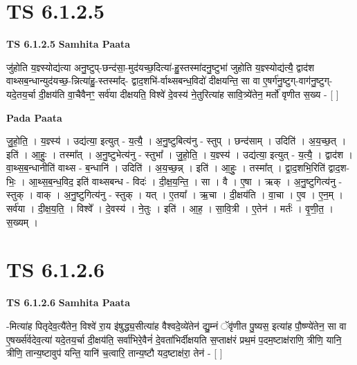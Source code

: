 \documentclass[17pt]{extarticle}
\begin{document}
\section*{ TS 6.1.2.5 }

\textbf{TS 6.1.2.5 } \newline
\textbf{Samhita Paata} \newline

जु॑होति य॒ज्ञ्स्योद्य॑त्या अनु॒ष्टुप्-छन्द॑सा॒-मुद॑यच्छ॒दित्या॑-हु॒स्तस्मा॑दनु॒ष्टुभा॑ जुहोति य॒ज्ञ्स्योद्य॑त्यै॒ द्वाद॑श वाथ्सब॒न्धान्युद॑यच्छ॒-न्नित्या॑हु॒-स्तस्मा᳚द्- द्वाद॒शभि॑-र्वाथ्सबन्ध॒विदो॑ दीक्षयन्ति॒ सा वा ए॒षर्ग॑नु॒ष्टुग्-वाग॑नु॒ष्टुग्-यदे॒तय॒र्चा दी॒क्षय॑ति वा॒चैवैनꣳ॒॒ सर्व॑या दीक्षयति॒ विश्वे॑ दे॒वस्य॑ ने॒तुरित्या॑ह सावि॒त्र्ये॑तेन॒ मर्तो॑ वृणीत स॒ख्य - [  ] \newline

\textbf{Pada Paata} \newline

जु॒हो॒ति॒ । य॒ज्ञ्स्य॑ । उद्य॑त्या॒ इत्युत् - य॒त्यै॒ । अ॒नु॒ष्टुबित्य॑नु - स्तुप् । छन्द॑साम् । उदिति॑ । अ॒य॒च्छ॒त् । इति॑ । आ॒हुः॒ । तस्मा᳚त् । अ॒नु॒ष्टुभेत्य॑नु - स्तुभा᳚ । जु॒हो॒ति॒ । य॒ज्ञ्स्य॑ । उद्य॑त्या॒ इत्युत् - य॒त्यै॒ । द्वाद॑श । वा॒थ्स॒ब॒न्धानीति॑ वाथ्स - ब॒न्धानि॑ । उदिति॑ । अ॒य॒च्छ॒न्न् । इति॑ । आ॒हुः॒ । तस्मा᳚त् । द्वा॒द॒शभि॒रिति॑ द्वाद॒श-भिः॒ । आ॒थ्स॒ब॒न्ध॒विद॒ इति॑ वाथ्सबन्ध - विदः॑ । दी॒क्ष॒य॒न्ति॒ । सा । वै । ए॒षा । ऋक् । अ॒नु॒ष्टुगित्य॑नु - स्तुक् । वाक् । अ॒नु॒ष्टुगित्य॑नु - स्तुक् । यत् । ए॒तया᳚ । ऋ॒चा । दी॒क्षय॑ति । वा॒चा । ए॒व । ए॒न॒म् । सर्व॑या । दी॒क्ष॒य॒ति॒ । विश्वे᳚ । दे॒वस्य॑ । ने॒तुः । इति॑ । आ॒ह॒ । सा॒वि॒त्री । ए॒तेन॑ । मर्तः॑ । वृ॒णी॒त॒ । स॒ख्यम् ।  \newline




\section*{ TS 6.1.2.6 }

\textbf{TS 6.1.2.6 } \newline
\textbf{Samhita Paata} \newline

-मित्या॑ह पितृदेव॒त्यै॑तेन॒ विश्वे॑ रा॒य इ॑षुद्ध्य॒सीत्या॑ह वैश्वदे॒व्ये॑तेन॑ द्यु॒म्नं ॅवृ॑णीत पु॒ष्यस॒ इत्या॑ह पौ॒ष्ण्ये॑तेन॒ सा वा ए॒षर्ख्स॑र्वदेव॒त्या॑ यदे॒तय॒र्चा दी॒क्षय॑ति॒ सर्वा॑भिरे॒वैनं॑ दे॒वता॑भिर्दीक्षयति स॒प्ताक्ष॑रं प्रथ॒मं प॒दम॒ष्टाक्ष॑राणि॒ त्रीणि॒ यानि॒ त्रीणि॒ तान्य॒ष्टावुप॑ यन्ति॒ यानि॑ च॒त्वारि॒ तान्य॒ष्टौ यद॒ष्टाक्ष॑रा॒ तेन॑ - [  ] \newline
\end{document}
